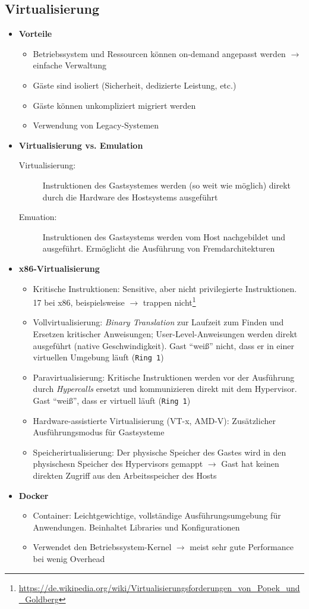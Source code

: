 \subsection{Virtualisierung}
\begin{itemize}
	\item \textbf{Vorteile}
	\begin{itemize}
		\item Betriebssystem und Ressourcen können on-demand angepasst werden \(\rightarrow\) einfache Verwaltung
		\item Gäste sind isoliert (Sicherheit, dedizierte Leistung, etc.)
		\item Gäste können unkompliziert migriert werden
		\item Verwendung von Legacy-Systemen
	\end{itemize}
	\item \textbf{Virtualisierung vs. Emulation}
	\begin{description}
		\item[Virtualisierung:] Instruktionen des Gastsystemes werden (so weit wie möglich) direkt durch die Hardware des Hostsystems ausgeführt
		\item[Emuation:] Instruktionen des Gastsystems werden vom Host nachgebildet und ausgeführt. Ermöglicht die Ausführung von Fremdarchitekturen
	\end{description}
	\item \textbf{x86-Virtualisierung}
	\begin{itemize}
		\item Kritische Instruktionen: Sensitive, aber nicht privilegierte Instruktionen. 17 bei x86, beispielsweise  \(\rightarrow\) trappen nicht\footnote{\url{https://de.wikipedia.org/wiki/Virtualisierungsforderungen_von_Popek_und_Goldberg}}
		\item Vollvirtualisierung: \textit{Binary Translation} zur Laufzeit zum Finden und Ersetzen kritischer Anweisungen; User-Level-Anweisungen werden direkt ausgeführt (native Geschwindigkeit). Gast "`weiß"' nicht, dass er in einer virtuellen Umgebung läuft (\texttt{Ring 1})
		\item Paravirtualisierung: Kritische Instruktionen werden vor der Ausführung durch \textit{Hypercalls} ersetzt und kommunizieren direkt mit dem Hypervisor. Gast "`weiß"', dass er virtuell läuft (\texttt{Ring 1})
		\item Hardware-assistierte Virtualisierung (VT-x, AMD-V): Zusätzlicher Ausführungsmodus für Gastsysteme
		\item Speicherirtualisierung: Der physische Speicher des Gastes wird in den physischesn Speicher des Hypervisors gemappt \(\rightarrow\) Gast hat keinen direkten Zugriff aus den Arbeitsspeicher des Hosts
	\end{itemize}
	\item \textbf{Docker}
	\begin{itemize}
		\item Container: Leichtgewichtige, vollständige Ausführungsumgebung für Anwendungen. Beinhaltet Libraries und Konfigurationen
		\item Verwendet den Betriebssystem-Kernel \(\rightarrow\) meist sehr gute Performance bei wenig Overhead
	\end{itemize}
\end{itemize}
